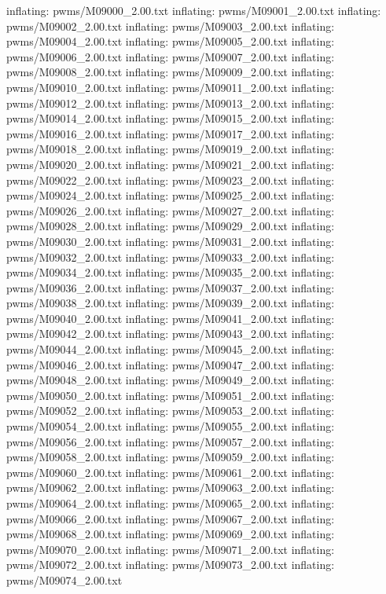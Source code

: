 \documentclass[letterpaper,10pt,english]{sphinxmanual}
\begin{document}
{\begin{sphinxVerbatim}[commandchars=\\\{\}]
  inflating: pwms/M09000\_2.00.txt
  inflating: pwms/M09001\_2.00.txt
  inflating: pwms/M09002\_2.00.txt
  inflating: pwms/M09003\_2.00.txt
  inflating: pwms/M09004\_2.00.txt
  inflating: pwms/M09005\_2.00.txt
  inflating: pwms/M09006\_2.00.txt
  inflating: pwms/M09007\_2.00.txt
  inflating: pwms/M09008\_2.00.txt
  inflating: pwms/M09009\_2.00.txt
  inflating: pwms/M09010\_2.00.txt
  inflating: pwms/M09011\_2.00.txt
  inflating: pwms/M09012\_2.00.txt
  inflating: pwms/M09013\_2.00.txt
  inflating: pwms/M09014\_2.00.txt
  inflating: pwms/M09015\_2.00.txt
  inflating: pwms/M09016\_2.00.txt
  inflating: pwms/M09017\_2.00.txt
  inflating: pwms/M09018\_2.00.txt
  inflating: pwms/M09019\_2.00.txt
  inflating: pwms/M09020\_2.00.txt
  inflating: pwms/M09021\_2.00.txt
  inflating: pwms/M09022\_2.00.txt
  inflating: pwms/M09023\_2.00.txt
  inflating: pwms/M09024\_2.00.txt
  inflating: pwms/M09025\_2.00.txt
  inflating: pwms/M09026\_2.00.txt
  inflating: pwms/M09027\_2.00.txt
  inflating: pwms/M09028\_2.00.txt
  inflating: pwms/M09029\_2.00.txt
  inflating: pwms/M09030\_2.00.txt
  inflating: pwms/M09031\_2.00.txt
  inflating: pwms/M09032\_2.00.txt
  inflating: pwms/M09033\_2.00.txt
  inflating: pwms/M09034\_2.00.txt
  inflating: pwms/M09035\_2.00.txt
  inflating: pwms/M09036\_2.00.txt
  inflating: pwms/M09037\_2.00.txt
  inflating: pwms/M09038\_2.00.txt
  inflating: pwms/M09039\_2.00.txt
  inflating: pwms/M09040\_2.00.txt
  inflating: pwms/M09041\_2.00.txt
  inflating: pwms/M09042\_2.00.txt
  inflating: pwms/M09043\_2.00.txt
  inflating: pwms/M09044\_2.00.txt
  inflating: pwms/M09045\_2.00.txt
  inflating: pwms/M09046\_2.00.txt
  inflating: pwms/M09047\_2.00.txt
  inflating: pwms/M09048\_2.00.txt
  inflating: pwms/M09049\_2.00.txt
  inflating: pwms/M09050\_2.00.txt
  inflating: pwms/M09051\_2.00.txt
  inflating: pwms/M09052\_2.00.txt
  inflating: pwms/M09053\_2.00.txt
  inflating: pwms/M09054\_2.00.txt
  inflating: pwms/M09055\_2.00.txt
  inflating: pwms/M09056\_2.00.txt
  inflating: pwms/M09057\_2.00.txt
  inflating: pwms/M09058\_2.00.txt
  inflating: pwms/M09059\_2.00.txt
  inflating: pwms/M09060\_2.00.txt
  inflating: pwms/M09061\_2.00.txt
  inflating: pwms/M09062\_2.00.txt
  inflating: pwms/M09063\_2.00.txt
  inflating: pwms/M09064\_2.00.txt
  inflating: pwms/M09065\_2.00.txt
  inflating: pwms/M09066\_2.00.txt
  inflating: pwms/M09067\_2.00.txt
  inflating: pwms/M09068\_2.00.txt
  inflating: pwms/M09069\_2.00.txt
  inflating: pwms/M09070\_2.00.txt
  inflating: pwms/M09071\_2.00.txt
  inflating: pwms/M09072\_2.00.txt
  inflating: pwms/M09073\_2.00.txt
  inflating: pwms/M09074\_2.00.txt

\end{sphinxVerbatim}}
\end{document}

